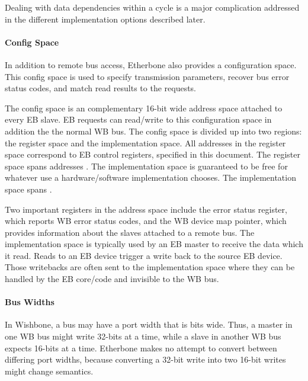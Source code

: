 \vspace{5 mm}

\noindent Dealing with data dependencies within a cycle is a major complication addressed in the different implementation options described later.

\paragraph{Config Space}

In addition to remote bus access, Etherbone also provides a configuration space. 
This config space is used to specify transmission parameters, recover bus error status codes, and match read results to the requests.

\vspace{5 mm}

\noindent The config space is an complementary 16-bit wide address space attached to every EB slave. 
EB requests can read/write to this configuration space in addition the the normal WB bus. 
The config space is divided up into two regions: the register space and the implementation space. 
All addresses in the register space correspond to EB control registers, specified in this document. 
The register space spans addresses . 
The implementation space is guaranteed to be free for whatever use a hardware/software implementation chooses. 
The implementation space spans .

\vspace{5 mm}

\noindent Two important registers in the address space include the error status register, which reports WB error status codes, and the WB device map
pointer, which provides information about the slaves attached to a remote bus. 
The implementation space is typically used by an EB master to receive the data which it read. 
Reads to an EB device trigger a write back to the source EB device. 
Those writebacks are often sent to the implementation space where they can be handled by the EB core/code and invisible to the WB bus.

\paragraph{Bus Widths}

In Wishbone, a bus may have a port width that is  bits wide.
Thus, a master in one WB bus might write 32-bits at a time, while a slave in another WB bus expects 16-bits at a time. 
Etherbone makes no attempt to convert between differing port widths, because converting a 32-bit write into two 16-bit writes might change semantics.

